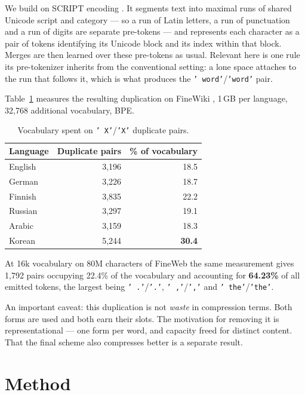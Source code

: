 \documentclass[11pt]{article}
\begin{document}
We build on SCRIPT encoding \citep{scriptbpe}. It segments text into maximal runs of shared
Unicode script and category --- so a run of Latin letters, a run of punctuation and a run of
digits are separate pre-tokens --- and represents each character as a pair of tokens
identifying its Unicode block and its index within that block. Merges are then learned over
these pre-tokens as usual. Relevant here is one rule its pre-tokenizer inherits from the
conventional setting: a lone space attaches to the run that follows it, which is what
produces the \texttt{' word'}/\texttt{'word'} pair.

Table~\ref{tab:dup} measures the resulting duplication on FineWiki
\citep{penedo2025finewiki}, 1\,GB per language, 32{,}768 additional vocabulary, BPE.

\begin{table}[t]
\centering
\small
\begin{tabular}{lrr}
\toprule
Language & Duplicate pairs & \% of vocabulary \\
\midrule
English & 3{,}196 & 18.5 \\
German  & 3{,}226 & 18.7 \\
Finnish & 3{,}835 & 22.2 \\
Russian & 3{,}297 & 19.1 \\
Arabic  & 3{,}159 & 18.3 \\
Korean  & 5{,}244 & \textbf{30.4} \\
\bottomrule
\end{tabular}
\caption{Vocabulary spent on \texttt{' X'}/\texttt{'X'} duplicate pairs.}
\label{tab:dup}
\end{table}

At 16k vocabulary on 80M characters of FineWeb \citep{penedo2024fineweb} the same
measurement gives 1{,}792 pairs occupying 22.4\% of the vocabulary and accounting for
\textbf{64.23\%} of all emitted tokens, the largest being \texttt{' .'}/\texttt{'.'},
\texttt{' ,'}/\texttt{','} and \texttt{' the'}/\texttt{'the'}.

An important caveat: this duplication is not \emph{waste} in compression terms. Both forms
are used and both earn their slots. The motivation for removing it is representational ---
one form per word, and capacity freed for distinct content. That the final scheme also
compresses better is a separate result.

\section{Method}
\label{sec:method}
\end{document}
